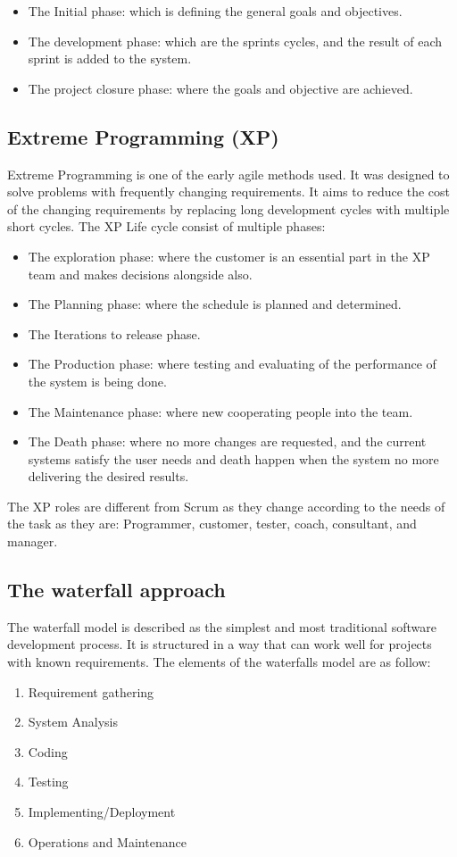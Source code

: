 \documentclass[conference,onecolumn]{IEEEtran}
\begin{document}
	\begin{itemize}
		\item The Initial phase: which is defining the general goals and objectives.
		\item The development phase: which are the sprints cycles, and the result of each sprint is added to the system.
		\item The project closure phase: where the goals and objective are achieved.
	\end{itemize}

\subsection{Extreme Programming (XP)}
	Extreme Programming is one of the early agile methods used. It was designed to solve problems with frequently changing requirements. It aims to reduce the cost of the changing requirements by replacing long development cycles with multiple short cycles. The XP Life cycle consist of multiple phases:

	\begin{itemize}
		\item The exploration phase: where the customer is an essential part in the XP team and makes decisions alongside also.
		\item The Planning phase: where the schedule is planned and determined.
		\item The Iterations to release phase.
		\item The Production phase: where testing and evaluating of the performance of the system is being done.
		\item The Maintenance phase: where new cooperating people into the team.
		\item The Death phase: where no more changes are requested, and the current systems satisfy the user needs and death happen when the system no more delivering the desired results.
	\end{itemize}

	The XP roles are different from Scrum as they change according to the needs of the task as they are: Programmer, customer, tester, coach, consultant, and manager.
 
	\subsection{The waterfall approach}
	The waterfall model is described as the simplest and most traditional software development process. It is structured in a way that can work well for projects with known requirements. The elements of the waterfalls model are as follow:
	\begin{multicols}{2}
		\begin{enumerate}
			\item Requirement gathering
			\item System Analysis
			\item Coding
			\item Testing
			\item Implementing/Deployment
			\item Operations and Maintenance
		\end{enumerate}
	\end{multicols}
\end{document}
